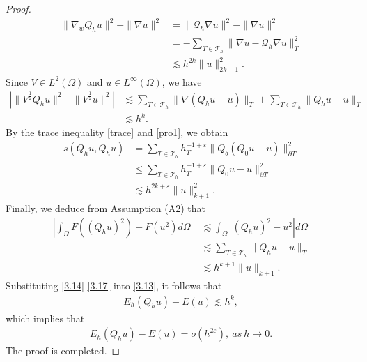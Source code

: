 \documentclass[compress, preprint,9pt]{elsarticle}
\numberwithin{equation}{section}
\newcommand{\Q}{{\mathcal{Q}}}
\newcommand{\sumT}{\sum_{T\in\mathcal{T}_h}}     %
\newcommand{\eps}{\varepsilon}
\begin{document}
\begin{proof}
	\begin{equation}\label{3.15}
		\begin{aligned}
			\|\nabla_wQ_hu\|^2-\|\nabla u\|^2&=\|\Q_h\nabla u\|^2-\|\nabla u\|^2\\
			&=-\sumT\|\nabla u-\Q_h\nabla u\|_T^2\\
			&\lesssim h^{2k}\|u\|_{2k+1}^2.
		\end{aligned}
	\end{equation}
	Since $V\in L^2(\Omega)$ and $u\in L^\infty(\Omega)$, we have
	\begin{equation}\label{3.16}
		\begin{aligned}
			\left|\|V^\frac{1}{2} Q_hu\|^2-\|V^\frac{1}{2} u\|^2\right|&\lesssim \sumT\|\nabla(Q_hu-u)\|_T+\sumT\|Q_hu-u\|_T\\
			&\lesssim h^k.
		\end{aligned}
	\end{equation}
	By the trace inequality \eqref{trace} and \eqref{pro1}, we obtain
	\begin{equation}\label{3.17}
		\begin{aligned}
			s(Q_hu,Q_hu)&=\sumT h_T^{-1+\eps}\| Q_b(Q_0u-u)\|_{\partial T}^2\\
			&\le \sumT h_T^{-1+\eps}\| Q_0u-u\|_{\partial T}^2\\
			&\lesssim h^{2k+\eps}\|u\|_{k+1}^2.
		\end{aligned}
	\end{equation}
	Finally, we deduce from Assumption (A2) that
	\begin{equation}\label{3.18}
		\begin{aligned}
			\left|\int_\Omega F((Q_hu)^2)-F(u^2)d\Omega\right|&\lesssim \int_\Omega |(Q_hu)^2-u^2|d\Omega\\
			&\lesssim \sumT\|Q_hu-u\|_T\\
			&\lesssim h^{k+1}\|u\|_{k+1}.
		\end{aligned}
	\end{equation}
	Substituting \eqref{3.14}-\eqref{3.17} into \eqref{3.13}, it follows that
	\begin{eqnarray*}
		E_h(Q_hu)-E(u)\lesssim h^k,
	\end{eqnarray*}
	which implies that
	\begin{eqnarray*}
		E_h(Q_hu)-E(u)=o(h^{2\eps}),~ as~ h\rightarrow0.
	\end{eqnarray*}
	The proof is completed.
\end{proof}
\end{document}
